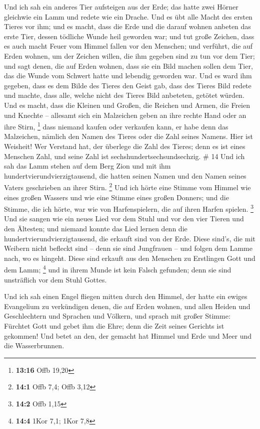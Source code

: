  Und ich sah ein anderes Tier aufsteigen aus der Erde; das
hatte zwei Hörner gleichwie ein Lamm und redete wie ein Drache.
 Und es übt alle Macht des ersten Tieres vor ihm; und es
macht, dass die Erde und die darauf wohnen anbeten das erste Tier,
dessen tödliche Wunde heil geworden war;  und tut große
Zeichen, dass es auch macht Feuer vom Himmel fallen vor den Menschen;
 und verführt, die auf Erden wohnen, um der Zeichen willen,
die ihm gegeben sind zu tun vor dem Tier; und sagt denen, die auf Erden
wohnen, dass sie ein Bild machen sollen dem Tier, das die Wunde vom
Schwert hatte und lebendig geworden war.  Und es ward ihm
gegeben, dass es dem Bilde des Tieres den Geist gab, dass des Tieres
Bild redete und machte, dass alle, welche nicht des Tieres Bild
anbeteten, getötet würden.  Und es macht, dass die Kleinen
und Großen, die Reichen und Armen, die Freien und Knechte -- allesamt
sich ein Malzeichen geben an ihre rechte Hand oder an ihre Stirn,
\footnote{\textbf{13:16} Offb 19,20}  dass niemand kaufen
oder verkaufen kann, er habe denn das Malzeichen, nämlich den Namen des
Tieres oder die Zahl seines Namens.  Hier ist Weisheit! Wer
Verstand hat, der überlege die Zahl des Tieres; denn es ist eines
Menschen Zahl, und seine Zahl ist sechshundertsechsundsechzig. \# 14
 Und ich sah das Lamm stehen auf dem Berg Zion und mit ihm
hundertvierundvierzigtausend, die hatten seinen Namen und den Namen
seines Vaters geschrieben an ihrer Stirn. \footnote{\textbf{14:1} Offb
  7,4; Offb 3,12}  Und ich hörte eine Stimme vom Himmel wie
eines großen Wassers und wie eine Stimme eines großen Donners; und die
Stimme, die ich hörte, war wie von Harfenspielern, die auf ihren Harfen
spielen. \footnote{\textbf{14:2} Offb 1,15}  Und sie sangen
wie ein neues Lied vor dem Stuhl und vor den vier Tieren und den
Ältesten; und niemand konnte das Lied lernen denn die
hundertvierundvierzigtausend, die erkauft sind von der Erde.
 Diese sind's, die mit Weibern nicht befleckt sind -- denn
sie sind Jungfrauen -- und folgen dem Lamme nach, wo es hingeht. Diese
sind erkauft aus den Menschen zu Erstlingen Gott und dem Lamm;
\footnote{\textbf{14:4} 1Kor 7,1; 1Kor 7,8}  und in ihrem
Munde ist kein Falsch gefunden; denn sie sind unsträflich vor dem Stuhl
Gottes.

 Und ich sah einen Engel fliegen mitten durch den Himmel,
der hatte ein ewiges Evangelium zu verkündigen denen, die auf Erden
wohnen, und allen Heiden und Geschlechtern und Sprachen und Völkern,
 und sprach mit großer Stimme: Fürchtet Gott und gebet ihm
die Ehre; denn die Zeit seines Gerichts ist gekommen! Und betet an den,
der gemacht hat Himmel und Erde und Meer und die Wasserbrunnen.

